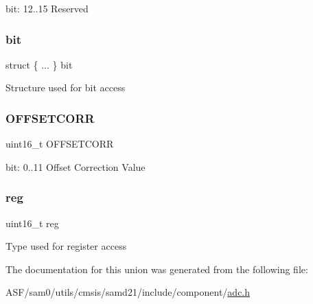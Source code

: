 bit\+: 12..15 Reserved \mbox{\label{union_a_d_c___o_f_f_s_e_t_c_o_r_r___type_a7234412b2565401c0ed6279ea1852e3b}} 
\subsubsection{\texorpdfstring{bit}{bit}}
{\footnotesize\ttfamily struct \{ ... \}   bit}

Structure used for bit access \mbox{\label{union_a_d_c___o_f_f_s_e_t_c_o_r_r___type_a09a2a9296df5760b3b6023a4fb92b272}} 
\subsubsection{\texorpdfstring{OFFSETCORR}{OFFSETCORR}}
{\footnotesize\ttfamily uint16\+\_\+t O\+F\+F\+S\+E\+T\+C\+O\+RR}

bit\+: 0..11 Offset Correction Value \mbox{\label{union_a_d_c___o_f_f_s_e_t_c_o_r_r___type_a11760f5020019f4aa8cb02e694f7cc44}} 
\subsubsection{\texorpdfstring{reg}{reg}}
{\footnotesize\ttfamily uint16\+\_\+t reg}

Type used for register access 

The documentation for this union was generated from the following file\+:\begin{DoxyCompactItemize}
\item 
A\+S\+F/sam0/utils/cmsis/samd21/include/component/\mbox{\hyperlink{component_2adc_8h}{adc.\+h}}\end{DoxyCompactItemize}
